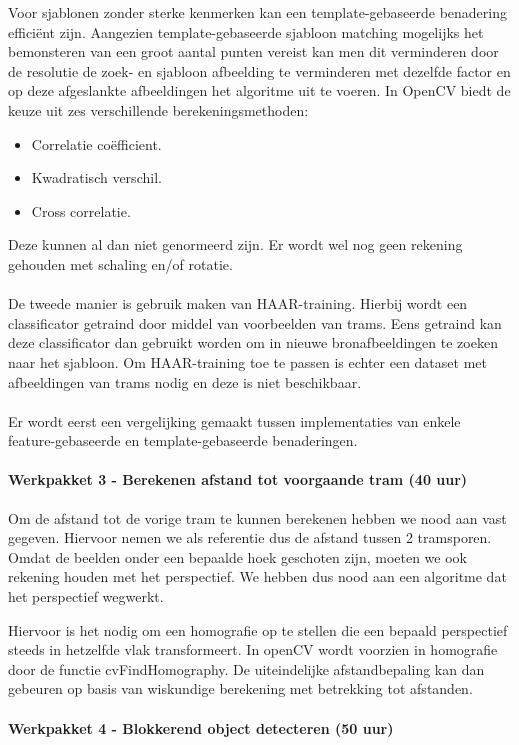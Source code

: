 \documentclass[a4paper,oneside,11pt,final]{memoir}
\begin{document}
Voor sjablonen zonder sterke kenmerken kan een template-gebaseerde benadering efficiënt zijn. Aangezien template-gebaseerde sjabloon matching mogelijks het bemonsteren van een groot aantal punten vereist kan men dit verminderen door de resolutie de zoek- en sjabloon afbeelding te verminderen met dezelfde factor en op deze afgeslankte afbeeldingen het algoritme uit te voeren. 
In OpenCV biedt de keuze uit zes verschillende berekeningsmethoden:
\begin{itemize}
\item Correlatie coëfficient.
\item Kwadratisch verschil.
\item Cross correlatie.
\end{itemize}
Deze kunnen al dan niet genormeerd zijn. Er wordt wel nog geen rekening gehouden met schaling en/of rotatie.
\\\\
De tweede manier is gebruik maken van HAAR-training. Hierbij wordt een classificator getraind door middel van voorbeelden van trams. Eens getraind kan deze classificator dan gebruikt worden om in nieuwe bronafbeeldingen te zoeken naar het sjabloon. Om HAAR-training toe te passen is echter een dataset met afbeeldingen van trams nodig en deze is niet beschikbaar.
\\\\
Er wordt eerst een vergelijking gemaakt tussen implementaties van enkele feature-gebaseerde en template-gebaseerde benaderingen.
\paragraph{Werkpakket 3 - Berekenen afstand tot voorgaande tram (40 uur)}

Om de afstand tot de vorige tram te kunnen berekenen hebben we nood aan vast gegeven. Hiervoor nemen we als referentie dus de afstand tussen 2 tramsporen. Omdat de beelden onder een bepaalde hoek geschoten zijn, moeten we ook rekening houden met het perspectief. We hebben dus nood aan een algoritme dat het perspectief wegwerkt.

Hiervoor is het nodig om een homografie op te stellen die een bepaald perspectief steeds in hetzelfde vlak transformeert. In openCV wordt voorzien in homografie door de functie cvFindHomography. De uiteindelijke afstandbepaling kan dan gebeuren op basis van wiskundige berekening met betrekking tot afstanden.

\paragraph{Werkpakket 4 - Blokkerend object detecteren (50 uur)}
\end{document}
